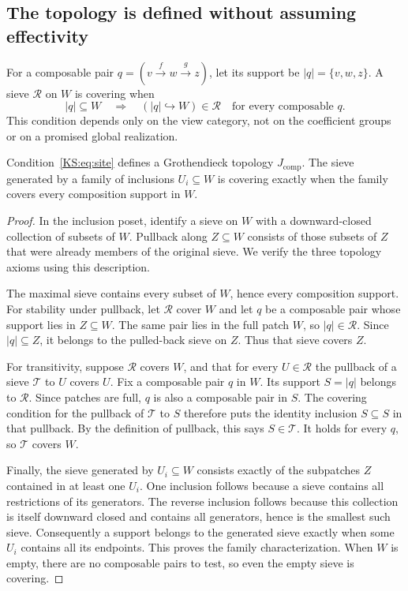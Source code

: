 \subsection{The topology is defined without assuming effectivity}
For a composable pair \(q=(v\xrightarrow f w\xrightarrow g z)\), let its support be \(|q|=\{v,w,z\}\). A sieve \(\mathcal R\) on \(W\) is covering when
\begin{equation}\label{KS:eq:site}
 |q|\subseteq W\quad\Longrightarrow\quad
 (|q|\hookrightarrow W)\in\mathcal R
 \quad\text{for every composable }q.
\end{equation}
This condition depends only on the view category, not on the coefficient groups or on a promised global realization.

\begin{KSproposition}\label{KS:KS35}
Condition~\eqref{KS:eq:site} defines a Grothendieck topology \(J_{\mathrm{comp}}\). The sieve generated by a family of inclusions \(U_i\subseteq W\) is covering exactly when the family covers every composition support in \(W\).
\end{KSproposition}
\begin{proof}
In the inclusion poset, identify a sieve on $W$ with a downward-closed collection of subsets of $W$. Pullback along $Z\subseteq W$ consists of those subsets of $Z$ that were already members of the original sieve. We verify the three topology axioms using this description.

The maximal sieve contains every subset of $W$, hence every composition support. For stability under pullback, let $\mathcal R$ cover $W$ and let $q$ be a composable pair whose support lies in $Z\subseteq W$. The same pair lies in the full patch $W$, so $|q|\in\mathcal R$. Since $|q|\subseteq Z$, it belongs to the pulled-back sieve on $Z$. Thus that sieve covers $Z$.

For transitivity, suppose $\mathcal R$ covers $W$, and that for every $U\in\mathcal R$ the pullback of a sieve $\mathcal T$ to $U$ covers $U$. Fix a composable pair $q$ in $W$. Its support $S=|q|$ belongs to $\mathcal R$. Since patches are full, $q$ is also a composable pair in $S$. The covering condition for the pullback of $\mathcal T$ to $S$ therefore puts the identity inclusion $S\subseteq S$ in that pullback. By the definition of pullback, this says $S\in\mathcal T$. It holds for every $q$, so $\mathcal T$ covers $W$.

Finally, the sieve generated by $U_i\subseteq W$ consists exactly of the subpatches $Z$ contained in at least one $U_i$. One inclusion follows because a sieve contains all restrictions of its generators. The reverse inclusion follows because this collection is itself downward closed and contains all generators, hence is the smallest such sieve. Consequently a support belongs to the generated sieve exactly when some $U_i$ contains all its endpoints. This proves the family characterization. When $W$ is empty, there are no composable pairs to test, so even the empty sieve is covering.
\end{proof}
